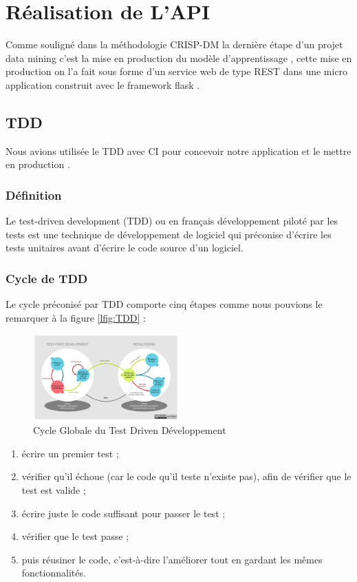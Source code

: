 \section{Réalisation de L'\ac{API}}
Comme souligné dans la méthodologie \ac{CRISP-DM} la dernière étape d'un projet data mining c'est la mise en production du modèle d'apprentissage , cette mise en production on l'a fait sous forme d'un service web de type \ac{REST} dans une micro application construit avec le framework flask .
\subsection{\ac{TDD} \cite{TDD}} 
Nous avions utilisée le \ac{TDD} avec \ac{CI} pour concevoir notre application et le mettre en production .
\subsubsection{Définition}
Le test-driven development (TDD) ou en français développement piloté par les tests est une technique de développement de logiciel qui préconise d'écrire les tests unitaires avant d'écrire le code source d'un logiciel.
\subsubsection{Cycle de TDD}
Le cycle préconisé par TDD comporte cinq étapes comme nous pouvions le remarquer à la figure \ref{lfig:TDD}  :
\begin{figure}[ht]
	\centering
	\includegraphics[width=0.5\textwidth]{fig/Cycle-global-tdd.png}
	\caption{Cycle Globale du Test Driven Développement  }
	\label{fig:TDD}
\end{figure}  
\begin{enumerate}
	\item écrire un premier test ;
	\item vérifier qu'il échoue (car le code qu'il teste n'existe pas), afin de vérifier que le test est valide ;
	\item écrire juste le code suffisant pour passer le test ;
	\item vérifier que le test passe ;
	\item puis réusiner le code, c'est-à-dire l'améliorer tout en gardant les mêmes fonctionnalités.
\end{enumerate}
